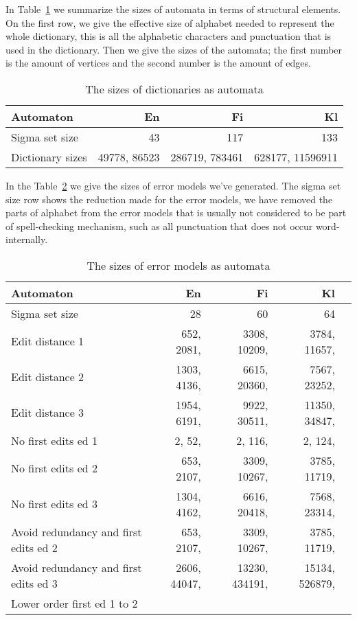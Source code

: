 \documentclass[11pt]{article}
\begin{document}
In Table~\ref{table:dictionary-sizes} we summarize the sizes of automata in
terms of structural elements. On the first row, we give the effective size of
alphabet needed to represent the whole dictionary, this is all the alphabetic
characters and punctuation that is used in the dictionary. Then we give the
sizes of the automata; the first number is the amount of vertices and the
second number is the amount of edges.

\begin{table}[h]
\begin{center}
\begin{scriptsize}
\begin{tabular}{|l|rrr|}
\hline
\bf Automaton & \bf En & \bf Fi & \bf Kl  \\ 
\hline
Sigma set size &
 43& 117& 133
\\
Dictionary sizes &
 49778, 86523& 286719, 783461& 628177, 11596911 \\
\hline
\end{tabular}
\end{scriptsize}
\end{center}
\caption{\label{table:dictionary-sizes}
The sizes of dictionaries as automata}
\end{table}

In the Table~\ref{table:error-sizes} we give the sizes of error models we've
generated. The sigma set size row shows the reduction made for the error models,
we have removed the parts of alphabet from the error models that is usually not
considered to be part of spell-checking mechanism, such as all punctuation that
does not occur word-internally.

\begin{table}[h]
\begin{center}
\begin{scriptsize}
\begin{tabular}{|l|rrrr|}
\hline
\bf Automaton & \bf En & \bf Fi & \bf Kl  \\ 
\hline
Sigma set size &
 28& 60& 64
\\
Edit distance 1 &
 652, 2081,& 3308, 10209,& 3784, 11657,
\\
Edit distance 2 &
 1303, 4136,& 6615, 20360,& 7567, 23252,
\\
Edit distance 3 &
 1954, 6191,& 9922, 30511,& 11350, 34847,
\\
No first edits ed 1 & 
 2, 52,& 2, 116,& 2, 124,
\\
No first edits ed 2 &
 653, 2107,& 3309, 10267,& 3785, 11719,
\\
No first edits ed 3 &
 1304, 4162,& 6616, 20418,& 7568, 23314,
\\
Avoid redundancy and first edits ed 2 &
 653, 2107,& 3309, 10267,& 3785, 11719,
\\
Avoid redundancy and first edits ed 3 &
 2606, 44047,& 13230, 434191,& 15134, 526879,
\\
Lower order first ed 1 to 2 &
&&
\\
\end{tabular}
\end{scriptsize}
\end{center}
\caption{\label{table:error-sizes}
The sizes of error models as automata}
\end{table}
\end{document}
